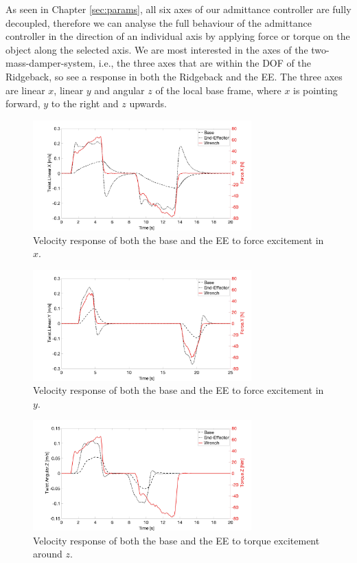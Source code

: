 As seen in Chapter \ref{sec:params}, all six axes of our admittance controller are fully decoupled, therefore we can analyse the full behaviour of the admittance controller in the direction of an individual axis by applying force or torque on the object along the selected axis. We are most interested in the axes of the two-mass-damper-system, i.e., the three axes that are within the DOF of the Ridgeback, so see a response in both the Ridgeback and the EE. The three axes are linear $x$, linear $y$ and angular $z$ of the local base frame, where $x$ is pointing forward, $y$ to the right and $z$ upwards.

\begin{figure}
   \centering
   \includegraphics[width=0.75\textwidth]{images/test18_x.jpg}
   \caption{Velocity response of both the base and the EE to force excitement in $x$.}
   \label{pics:test18_x}
\end{figure}

\begin{figure}
   \centering
   \includegraphics[width=0.75\textwidth]{images/test18_y.jpg}
   \caption{Velocity response of both the base and the EE to force excitement in $y$.}
   \label{pics:test18_y}
\end{figure}

\begin{figure}
   \centering
   \includegraphics[width=0.75\textwidth]{images/test18_theta.jpg}
   \caption{Velocity response  of both the base and the EE to torque excitement around $z$.}
   \label{pics:test18_theta}
\end{figure}

